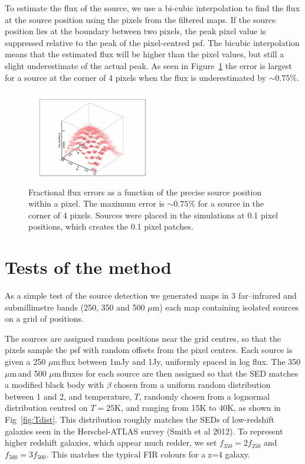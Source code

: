 \documentclass[useAMS,usenatbib]{mn2e}
\def\mic{ $\mu $m\,}
\begin{document}
To estimate the flux of the source, we use a bi-cubic interpolation to
find the flux at the source position using the pixels from the filtered
maps. If the source position lies at the boundary between two pixels,
the peak pixel value is suppressed relative to the  peak
of the pixel-centred psf. The bicubic interpolation means that the
estimated flux will be higher than the pixel values, but still a
slight underestimate of the actual peak. As seen in
Figure~\ref{fig:sub-pixel} the error is largest for a source at the
corner of 4 pixels when the flux is underestimated by  $\sim 0.75\%$. 

\begin{figure}
\includegraphics[width=0.5\textwidth]{subpixelposition_fluxerrors1.pdf}
\caption{Fractional flux errors as a function of the precise source
  position within a pixel. The maximum error is $\sim 0.75\%$ for a
  source in the corner of 4 pixels. Sources were placed in the
  simulations at 0.1 pixel positions, which creates the 0.1 pixel
  patches. 
\label{fig:sub-pixel}
}
\end{figure}

\section{Tests of the method} 

As a simple test of the source detection we generated maps in 3
far--infrared and submillimetre bands (250, 350 and 500
$\mu$m) each map containing isolated sources on a grid of positions.

The sources are assigned random positions near the grid centres, so
that the pixels sample the psf with random offsets from the pixel
centres.  Each source is given a 250\mic flux between 1mJy and 1Jy,
uniformly spaced in log flux. The 350\mic and 500\mic fluxes for each
source are then assigned so that the SED matches a modified black body
with $\beta$ chosen from a uniform random distribution between 1 and
2, and temperature, $T$, randomly chosen from a lognormal distribution
centred on $T=25$K, and ranging from 15K to 40K, as shown in
Fig~\ref{fig:Tdist}. This distribution roughly matches the SEDs of
low-redshift galaxies seen in the Herschel-ATLAS survey (Smith et al 2012). 
To represent higher redshift galaxies, which appear much redder, we
set $f_{350}= 2f_{250}$ and $f_{500} = 3 f_{500}$. This matches the
typical FIR colours for a z=4 galaxy. 
\end{document}
